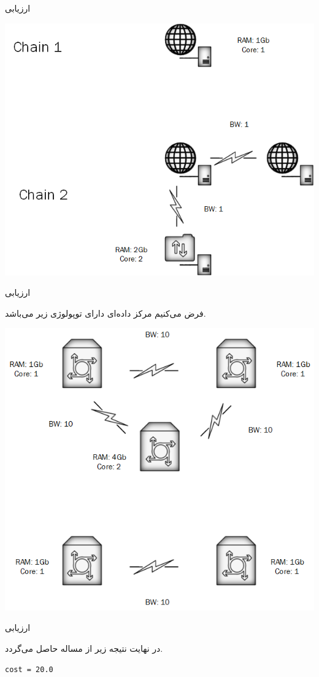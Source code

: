 \documentclass{beamer}
\begin{document}
\begin{persian}
\begin{frame}{ارزیابی}
    \begin{center}
        \includegraphics[scale=0.4]{../diagrams/e1-ch.png}
    \end{center}
\end{frame}
\begin{frame}{ارزیابی} %
    \par
    فرض می‌کنیم مرکز داده‌ای دارای توپولوژی زیر می‌باشد.

    \begin{center}
        \includegraphics[scale=0.4]{../diagrams/e1-tp.png}
    \end{center}
\end{frame}
\begin{frame}[fragile]{ارزیابی} %
    \par
    در نهایت نتیجه زیر از مساله حاصل می‌گردد.
    \begin{latin}\begin{verbatim}
cost = 20.0


\end{verbatim}
\end{latin}
\end{frame}
\end{persian}
\end{document}
